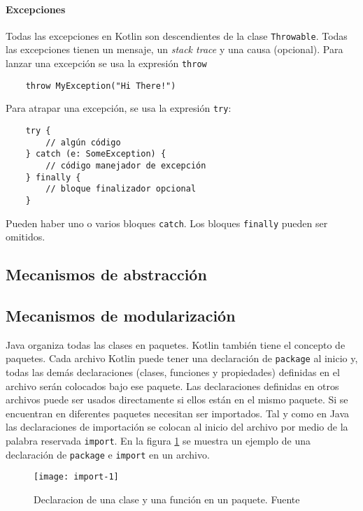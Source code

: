 \paragraph{Excepciones}
Todas las excepciones en Kotlin son descendientes de la clase \texttt{Throwable}. Todas las excepciones tienen un mensaje, un \emph{stack trace} y una causa (opcional). Para lanzar una excepción se usa la expresión \texttt{throw}
\begin{verbatim}
    throw MyException("Hi There!")
\end{verbatim}

Para atrapar una excepción, se usa la expresión \texttt{try}:
\begin{verbatim}
    try {
        // algún código
    } catch (e: SomeException) {
        // código manejador de excepción
    } finally {
        // bloque finalizador opcional
    }
\end{verbatim}
Pueden haber uno o varios bloques \texttt{catch}. Los bloques \texttt{finally} pueden ser omitidos. 

\subsection{Mecanismos de abstracción}

\subsection{Mecanismos de modularización}
Java organiza todas las clases en paquetes. Kotlin también tiene el concepto de paquetes. Cada archivo Kotlin puede tener una declaración de \texttt{package} al inicio y, todas las demás declaraciones (clases, funciones y propiedades) definidas en el archivo serán colocados bajo ese paquete. Las declaraciones definidas en otros archivos puede ser usados directamente si ellos están en el mismo paquete. Si se encuentran en diferentes paquetes necesitan ser importados. Tal y como en Java las declaraciones de importación se colocan al inicio del archivo por medio de la palabra reservada \texttt{import}. En la figura \ref{fig:import-1} se muestra un ejemplo de una declaración de \texttt{package} e \texttt{import} en un archivo.

\begin{figure}[h!]
  \texttt{[image: import-1]}
  \caption{Declaracion de una clase y una función en un paquete. Fuente \cite{kotlin-in-action}}
  \label{fig:import-1}
\end{figure}  

